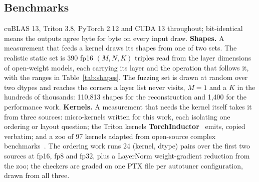\documentclass[sigplan,nonacm]{acmart}
\begin{document}
\subsection{Benchmarks}
\label{sec:eval-benchmarks}

cuBLAS 13, Triton 3.8, PyTorch 2.12 and CUDA 13 throughout; bit-identical means
the outputs agree byte for byte on every input draw. \textbf{Shapes.} A measurement that feeds a kernel draws its shapes from one of
two sets. The realistic static set is 390 fp16 $(M, N, K)$ triples read from the
layer dimensions of open-weight models, each carrying its layer and the
operation that follows it, with the ranges in Table~\ref{tab:shapes}. The
fuzzing set is drawn at random over two dtypes and reaches the corners a layer
list never visits, $M = 1$ and a $K$ in the hundreds of thousands: 110,813
shapes for the reconstruction and 1,400 for the performance work. \textbf{Kernels.} A measurement that needs the kernel itself takes it from three
sources: micro-kernels written for this work, each isolating one ordering or
layout question; the Triton kernels
\textbf{TorchInductor}~\cite{pytorch2_2024} emits, copied verbatim; and a zoo of
97 kernels adapted from open-source complex
benchmarks~\cite{triton_tutorials,tritonbench,flaggems,flashlinearattention,torchao}. The ordering work runs 24 (kernel, dtype) pairs
over the first two sources at fp16, fp8 and fp32, plus a LayerNorm
weight-gradient reduction from the zoo; the checkers are graded on one PTX file
per autotuner configuration, drawn from all three.
\end{document}
